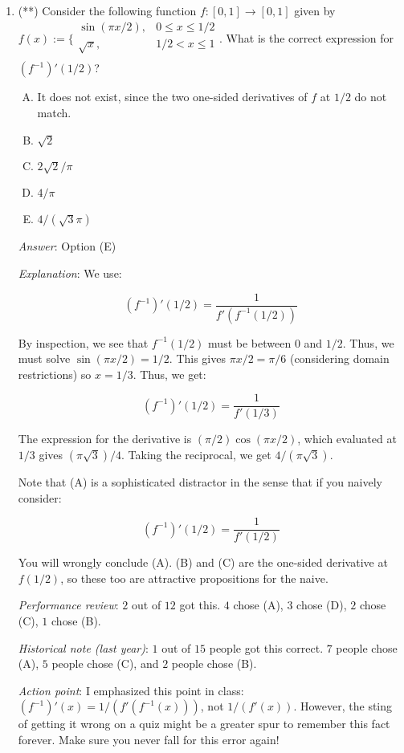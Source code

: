 \documentclass[10pt]{amsart}
\begin{document}
\begin{enumerate}
  {\em Action point}: This one should not trip you in the future
  either!

\item (**) Consider the following function $f:[0,1] \to [0,1]$ given
  by
  $f(x) := \lbrace\begin{array}{rl} \sin(\pi x/2), & 0 \le x \le 1/2 \\
    \sqrt{x}, & 1/2 < x \le 1\\\end{array}$. What is the correct
  expression for $(f^{-1})'(1/2)$?

  \begin{enumerate}[(A)]
  \item It does not exist, since the two one-sided derivatives of $f$ at
    $1/2$ do not match.
  \item $\sqrt{2}$
  \item $2\sqrt{2}/\pi$
  \item $4/\pi$
  \item $4/(\sqrt{3}\pi)$
  \end{enumerate}

  {\em Answer}: Option (E)

  {\em Explanation}: We use:

  $$(f^{-1})'(1/2) = \frac{1}{f'(f^{-1}(1/2))}$$

  By inspection, we see that $f^{-1}(1/2)$ must be between $0$ and
  $1/2$. Thus, we must solve $\sin(\pi x/2) = 1/2$. This gives $\pi x
  / 2 = \pi/6$ (considering domain restrictions) so $x = 1/3$. Thus, we get:

  $$(f^{-1})'(1/2) = \frac{1}{f'(1/3)}$$

  The expression for the derivative is $(\pi/2)\cos(\pi x/2)$, which
  evaluated at $1/3$ gives $(\pi\sqrt{3})/4$. Taking the reciprocal,
  we get $4/(\pi\sqrt{3})$.

  Note that (A) is a sophisticated distractor in the sense that if you
  naively consider:

  $$(f^{-1})'(1/2) = \frac{1}{f'(1/2)}$$

  You will wrongly conclude (A). (B) and (C) are the one-sided
  derivative at $f(1/2)$, so these too are attractive propositions for
  the naive.

  {\em Performance review}: $2$ out of $12$ got this. $4$ chose (A),
  $3$ chose (D), $2$ chose (C), $1$ chose (B).

  {\em Historical note (last year)}: $1$ out of $15$ people got this
  correct. $7$ people chose (A), $5$ people chose (C), and $2$ people
  chose (B).

  {\em Action point}: I emphasized this point in class: $(f^{-1})'(x)
  = 1/(f'(f^{-1}(x)))$, not $1/(f'(x))$. However, the sting of getting
  it wrong on a quiz might be a greater spur to remember this fact
  forever. Make sure you never fall for this error again!
\end{enumerate}
\end{document}
